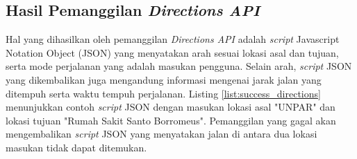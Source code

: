 \begin{table}[ht!]
\begin{tabular}{|p{3cm}|p{2.5cm}|p{2.5cm}|p{4cm}|p{3cm}|}
	\end{tabular}
\end{table}


\subsection{Hasil Pemanggilan \textit{Directions API}}
Hal yang dihasilkan oleh pemanggilan \textit{Directions API} adalah \textit{script} Javascript Notation Object (JSON) yang menyatakan arah  sesuai lokasi asal dan tujuan, serta mode perjalanan yang adalah masukan pengguna. Selain arah, \textit{script} JSON yang dikembalikan juga mengandung informasi mengenai jarak jalan yang ditempuh serta waktu tempuh perjalanan. Listing \ref{list:success_directions} menunjukkan contoh \textit{script} JSON dengan masukan lokasi asal "UNPAR" dan lokasi tujuan "Rumah Sakit Santo Borromeus". Pemanggilan yang gagal akan mengembalikan \textit{script} JSON yang menyatakan jalan di antara dua lokasi masukan tidak dapat ditemukan.



